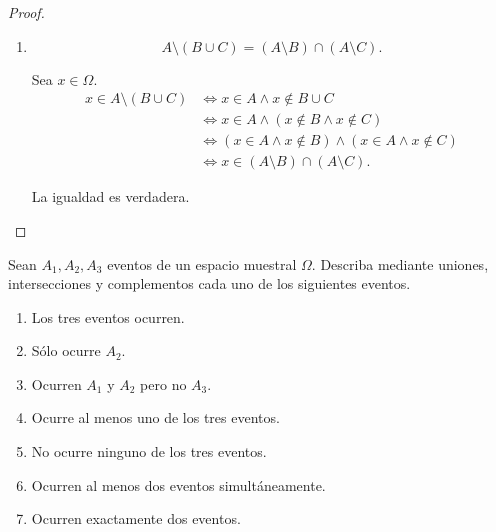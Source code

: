 \documentclass[12pt,a4paper]{article}
\begin{document}
\begin{proof}
\begin{enumerate}[label=(\alph*)]
            La igualdad es verdadera.
    
            \item
            \[
                A\setminus(B\cup C)
                = (A\setminus B)\cap(A\setminus C).
            \]
    
            Sea $x\in\Omega$.
            \begin{align*}
                x\in A\setminus(B\cup C)
                &\iff x\in A \land x\notin B\cup C \\
                &\iff x\in A \land (x\notin B \land x\notin C) \\
                &\iff (x\in A\land x\notin B)
                    \land
                    (x\in A\land x\notin C) \\
                &\iff x\in (A\setminus B)\cap(A\setminus C).
            \end{align*}
    
            La igualdad es verdadera.
    
        \end{enumerate}
    \end{proof}

    \begin{mdframed}[style=mdbluebox,frametitle={Ejercicio 4}]
        Sean $A_1, A_2, A_3$ eventos de un espacio muestral $\Omega$. Describa mediante uniones, intersecciones y complementos cada uno de los siguientes eventos.
        \begin{enumerate}[label=(\alph*)]
            \item Los tres eventos ocurren.
            \item Sólo ocurre $A_2$.
            \item Ocurren $A_1$ y $A_2$ pero no $A_3$.
            \item Ocurre al menos uno de los tres eventos.
            \item No ocurre ninguno de los tres eventos.
            \item Ocurren al menos dos eventos simultáneamente.
            \item Ocurren exactamente dos eventos.
        \end{enumerate}
    \end{mdframed}
\end{document}

